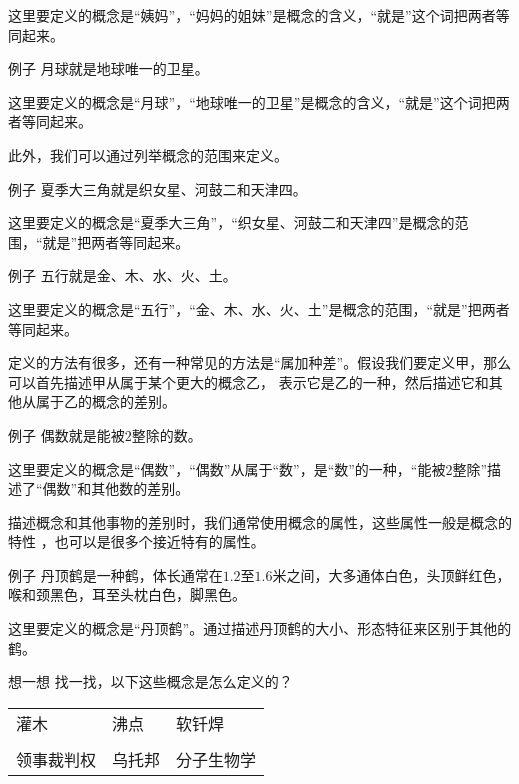 \documentclass[12pt,UTF8,a4paper]{article}
\begin{document}
这里要定义的概念是“姨妈”，“妈妈的姐妹”是概念的含义，“就是”这个词把两者等同起来。

\begin{blockin}{例子}
    月球就是地球唯一的卫星。 
\end{blockin}
    
这里要定义的概念是“月球”，“地球唯一的卫星”是概念的含义，“就是”这个词把两者等同起来。

此外，我们可以通过列举概念的范围来定义。

\begin{blockin}{例子}
    夏季大三角就是织女星、河鼓二和天津四。
\end{blockin}

这里要定义的概念是“夏季大三角”，“织女星、河鼓二和天津四”是概念的范围，“就是”把两者等同起来。

\begin{blockin}{例子}
    五行就是金、木、水、火、土。
\end{blockin}

这里要定义的概念是“五行”，“金、木、水、火、土”是概念的范围，“就是”把两者等同起来。

定义的方法有很多，还有一种常见的方法是“属加种差”。假设我们要定义甲，那么可以首先描述甲从属于某个更大的概念乙，
表示它是乙的一种，然后描述它和其他从属于乙的概念的差别。

\begin{blockin}{例子}
    偶数就是能被$2$整除的数。
\end{blockin}

这里要定义的概念是“偶数”，“偶数”从属于“数”，是“数”的一种，“能被$2$整除”描述了“偶数”和其他数的差别。

描述概念和其他事物的差别时，我们通常使用概念的属性，这些属性一般是概念的特性
，也可以是很多个接近特有的属性。

\begin{blockin}{例子}
    丹顶鹤是一种鹤，体长通常在$1.2$至$1.6$米之间，大多通体白色，头顶鲜红色，喉和颈黑色，耳至头枕白色，脚黑色。
\end{blockin}

这里要定义的概念是“丹顶鹤”。通过描述丹顶鹤的大小、形态特征来区别于其他的鹤。

\begin{blockaft}{想一想}
    找一找，以下这些概念是怎么定义的？\\
    \begin{center}
        \begin{tabular}{p{8em}<{\centering} p{8em}<{\centering} p{8em}<{\centering} }
            灌木 & 沸点 & 软钎焊 \\
            & & \\
            领事裁判权 & 乌托邦 & 分子生物学 \\
        \end{tabular}
    \end{center}
\end{blockaft}
\end{document}
